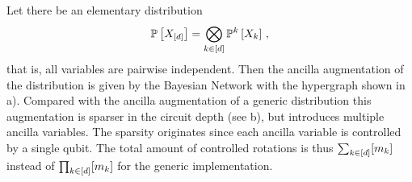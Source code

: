 \begin{example}
    Let there be an elementary distribution
    \begin{align*}
        \mathbb{P}\left[X_{[d]}\right] = \bigotimes_{k\in[d]} \mathbb{P}^{k}\left[X_{k}\right] \, ,
    \end{align*}
    that is, all variables are pairwise independent.
    Then the ancilla augmentation of the distribution is given by the Bayesian Network with the hypergraph shown in a).
    Compared with the ancilla augmentation of a generic distribution this augmentation is sparser in the circuit depth (see b), but introduces multiple ancilla variables.
    The sparsity originates since each ancilla variable is controlled by a single qubit.
    The total amount of controlled rotations is thus $\sum_{k\in[d]}[m_{k}]$ instead of $\prod_{k\in[d]}[m_{k}]$ for the generic implementation.

    \begin{figure}
        \begin{center}
\end{center}
\end{figure}
\end{example}
